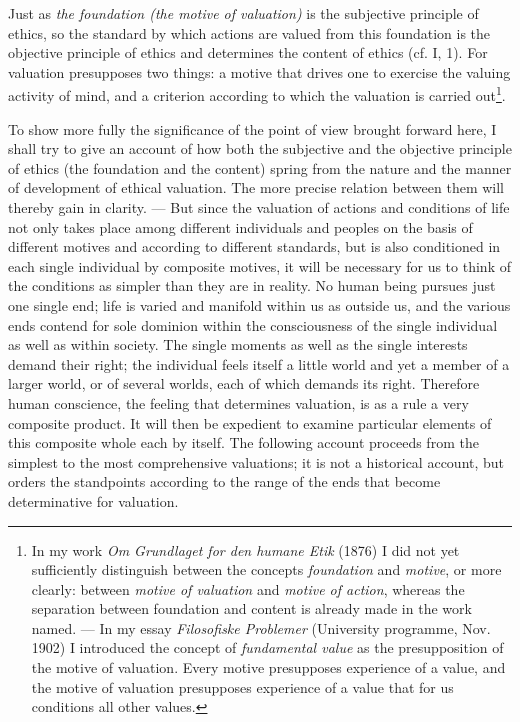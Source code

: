 \documentclass[12pt,a4paper,openany]{book}
\newcommand{\opage}[1]{\marginnote{\footnotesize\textit{[#1]}}}
\begin{document}
Just as \textit{the foundation (the motive of valuation)} is the subjective principle of ethics, so
the standard by which actions are valued from this foundation is the objective principle of ethics
and determines the content of ethics (cf. I, 1). For valuation presupposes two things: a motive that
drives one to exercise the valuing activity of mind, and a criterion according to which the
valuation is carried out\footnote[1]{In my work \textit{Om Grundlaget for den humane Etik} (1876) I
did not yet sufficiently distinguish between the concepts \textit{foundation} and \textit{motive},
or more clearly: between \textit{motive of valuation} and \textit{motive of action}, whereas the
separation between foundation and content is already made in the work named. --- In my essay
\textit{Filosofiske Problemer} (University programme, Nov. 1902) I introduced the concept of
\textit{fundamental value} as the presupposition of the motive of valuation. Every motive presupposes
experience of a value, and the motive of valuation presupposes experience of a value that for us
conditions all other values.}.

To show more fully the significance of the point of view brought forward here, I shall try to give
an account of how both the subjective and the objective principle of ethics (the foundation and the
content) spring from the nature and the manner of development of ethical valuation. The more
precise relation between them will thereby gain in clarity. --- But since the valuation of actions
and conditions of life not only takes place among different individuals and peoples on the basis
of different motives and according to different standards, but is also conditioned in each single
individual by composite motives, it will be necessary for us to think of the conditions as simpler
than they are in reality. No human being
\opage{28}pursues just one single end; life is varied and manifold within us as outside us, and the
various ends contend for sole dominion within the consciousness of the single individual as well as
within society. The single moments as well as the single interests demand their right; the
individual feels itself a little world and yet a member of a larger world, or of several worlds,
each of which demands its right. Therefore human conscience, the feeling that determines
valuation, is as a rule a very composite product. It will then be expedient to examine particular
elements of this composite whole each by itself. The following account proceeds from the simplest
to the most comprehensive valuations; it is not a historical account, but orders the standpoints
according to the range of the ends that become determinative for valuation.
\end{document}
